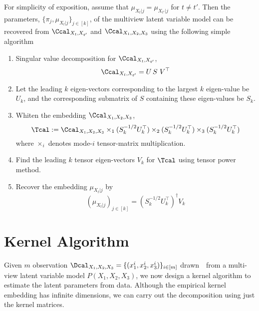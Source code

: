 \documentclass[11pt]{article}
\begin{document}
For simplicity of exposition, assume that $\mu_{X_t|j} = \mu_{X_{t'}|j}$ for $t\neq t'$. Then the parameters, $\{\pi_j, \mu_{X_t|j}\}_{j \in [k]}$, of the multiview latent variable model can be recovered from $\Ccal_{X_t,X_{t'}}$ and $\Ccal_{X_1,X_2,X_3}$ using the following simple algorithm
\begin{enumerate}
  \item Singular value decomposition for $\Ccal_{X_t,X_{t'}}$,
    $$\Ccal_{X_t,X_{t'}} = U\, S\,\, V^\top$$
  \item Let the leading $k$ eigen-vectors corresponding to the largest $k$ eigen-value be $U_k$, and the corresponding submatrix of $S$ containing these eigen-values be $S_k$.
  \item Whiten the embedding $\Ccal_{X_1,X_2,X_3}$,
    $$\Tcal := \Ccal_{X_1,X_2,X_3} \times_1 (S_k^{-1/2}U_k^\top) \times_2 (S_k^{-1/2}U_k^\top) \times_3 (S_k^{-1/2}U_k^\top)$$
    where $\times_i$ denotes mode-$i$ tensor-matrix multiplication.
  \item Find the leading $k$ tensor eigen-vectors $V_k$ for $\Tcal$ using tensor power method.
  \item Recover the embedding $\mu_{X_t|j}$ by
    $$ (\mu_{X_t|j})_{j \in [k]}  = (S_k^{-1/2}U_k^\top)^\dagger V_k $$
\end{enumerate}

\section{Kernel Algorithm}

Given $m$ observation $\Dcal_{X_1,X_2,X_3}=\{(x_1^i,x_2^i,x_3^i)\}_{i \in [m]}$ drawn~\iid~from a multi-view latent variable model $P(X_1,X_2,X_3)$, we now design a kernel algorithm to estimate the latent parameters from data. Although the empirical kernel embedding has infinite dimensions, we can carry out the decomposition using just the kernel matrices.
\end{document}
